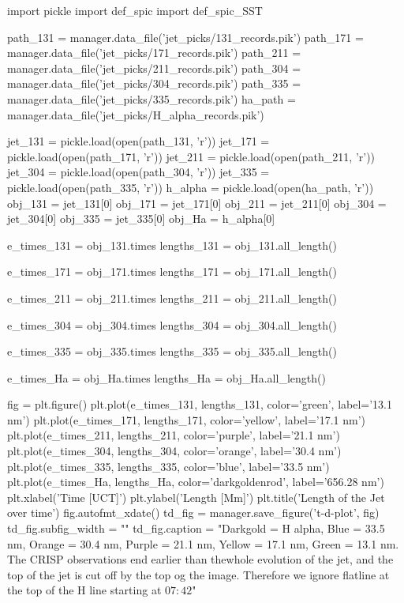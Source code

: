 \documentclass{emulateapj}
\begin{document}
\begin{pycode}[T-D-plots]
import pickle
import def_spic
import def_spic_SST

path_131 = manager.data_file('jet_picks/131_records.pik')
path_171 = manager.data_file('jet_picks/171_records.pik')
path_211 = manager.data_file('jet_picks/211_records.pik')
path_304 = manager.data_file('jet_picks/304_records.pik')
path_335 = manager.data_file('jet_picks/335_records.pik')
ha_path = manager.data_file('jet_picks/H_alpha_records.pik')

jet_131 = pickle.load(open(path_131, 'r'))
jet_171 = pickle.load(open(path_171, 'r'))
jet_211 = pickle.load(open(path_211, 'r'))
jet_304 = pickle.load(open(path_304, 'r'))
jet_335 = pickle.load(open(path_335, 'r'))
h_alpha = pickle.load(open(ha_path, 'r'))
obj_131 = jet_131[0]
obj_171 = jet_171[0]
obj_211 = jet_211[0]
obj_304 = jet_304[0]
obj_335 = jet_335[0]
obj_Ha = h_alpha[0]

e_times_131 = obj_131.times
lengths_131 = obj_131.all_length()

e_times_171 = obj_171.times
lengths_171 = obj_171.all_length()

e_times_211 = obj_211.times
lengths_211 = obj_211.all_length()

e_times_304 = obj_304.times
lengths_304 = obj_304.all_length()

e_times_335 = obj_335.times
lengths_335 = obj_335.all_length()

e_times_Ha = obj_Ha.times
lengths_Ha = obj_Ha.all_length()

fig = plt.figure()
plt.plot(e_times_131, lengths_131, color='green', label='13.1 nm')
plt.plot(e_times_171, lengths_171, color='yellow', label='17.1 nm')
plt.plot(e_times_211, lengths_211, color='purple', label='21.1 nm')
plt.plot(e_times_304, lengths_304, color='orange', label='30.4 nm')
plt.plot(e_times_335, lengths_335, color='blue', label='33.5 nm')
plt.plot(e_times_Ha, lengths_Ha, color='darkgoldenrod', label='656.28 nm')
plt.xlabel('Time [UCT]')
plt.ylabel('Length [Mm]')
plt.title('Length of the Jet over time')
fig.autofmt_xdate()
td_fig = manager.save_figure('t-d-plot', fig)
td_fig.subfig_width = "\columnwidth"
td_fig.caption = "Darkgold = H alpha, Blue = 33.5 nm, Orange = 30.4 nm, Purple = 21.1 nm, Yellow = 17.1 nm, Green = 13.1 nm. The CRISP observations end earlier than thewhole evolution of the jet, and the top of the jet is cut off by the top og the image. Therefore we ignore flatline at the top of the H \alpha line starting at $07:42$"


\end{pycode}
\end{document}

